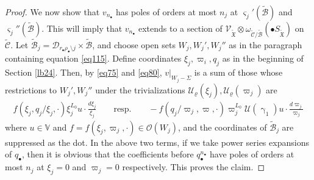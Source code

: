 \documentclass[12pt,a4paper,notitlepage]{report}
\theoremstyle{definition}
\theoremstyle{plain}
\newcommand{\fk}{\mathfrak}
\newcommand{\mc}{\mathcal}
\newcommand{\wtd}{\widetilde}
\newcommand{\scr}{\mathscr}
\newcommand{\sgm}{\varsigma}
\newcommand{\blt}{\bullet}
\newcommand{\Vbb}{\mathbb V}
\numberwithin{equation}{section}
\begin{document}
\begin{proof}
We now show that $v_{n_\blt}$ has poles of orders at most $n_j$ at $\sgm_j'(\wtd{\mc B})$ and $\sgm_j''(\wtd{\mc B})$. This will imply that $v_{n_\blt}$ extends to a section of $\scr V_{\wtd{\fk X}}\otimes\omega_{\wtd{\mc C}/\wtd{\mc B}}(\blt S_{\wtd{\fk X}})$ on $\wtd{\mc C}$. Let  $\wtd{\mc B}_j=\mc D_{r_\blt\rho_\blt\setminus j}\times\wtd{\mc B}$, and choose open sets $W_j,W_j',W_j''$  as in the paragraph containing equation \eqref{eq115}. Define coordinates $\xi_j,\varpi_i,q_j$ as in the beginning of Section \ref{lb24}.  Then, by \eqref{eq75} and \eqref{eq80}, $v|_{W_j-\Sigma}$ is a sum of those whose restrictions to $W_j',W_j''$  under the trivializations $\mc U_\varrho(\xi_j),\mc U_\varrho(\varpi_j)$ are
\begin{align}
f(\xi_j,q_j/\xi_j,\cdot)\xi_j^{L_0}u\cdot \frac{d\xi_j}{\xi_j}  \qquad\text{resp.}\qquad -f(q_j/\varpi_j,\varpi,\cdot)\varpi_j^{L_0}\mc U(\upgamma_1)u\cdot \frac{d\varpi_j}{\varpi_j}\label{eq118}
\end{align}
where $u\in\Vbb$ and $f=f(\xi_j,\varpi_j,\cdot)\in\scr O(W_j)$, and the coordinates of $\wtd {\mc B}_j$ are suppressed as the dot. In the above two terms, if we take power series expansions of $q_\blt$, then it is obvious that the coefficients before  $q_\blt^{n_\blt}$ have poles of orders at most $n_j$ at $\xi_j=0$ and $\varpi_j=0$ respectively. This proves the claim.



\end{proof}
\end{document}
